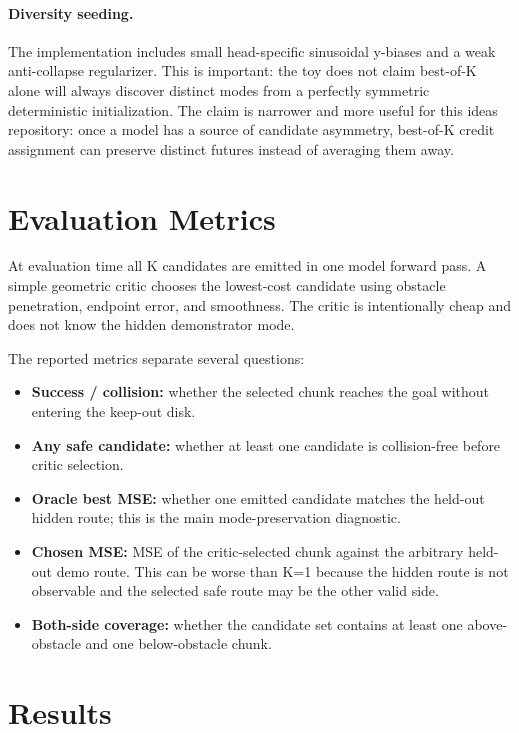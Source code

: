 \documentclass[11pt]{article}
\begin{document}
\paragraph{Diversity seeding.}
The implementation includes small head-specific sinusoidal y-biases and a weak anti-collapse regularizer. This is important: the toy does not claim best-of-K alone will always discover distinct modes from a perfectly symmetric deterministic initialization. The claim is narrower and more useful for this ideas repository: once a model has a source of candidate asymmetry, best-of-K credit assignment can preserve distinct futures instead of averaging them away.

\section{Evaluation Metrics}

At evaluation time all K candidates are emitted in one model forward pass. A simple geometric critic chooses the lowest-cost candidate using obstacle penetration, endpoint error, and smoothness. The critic is intentionally cheap and does not know the hidden demonstrator mode.

The reported metrics separate several questions:
\begin{itemize}[leftmargin=1.5em]
  \item \textbf{Success / collision:} whether the selected chunk reaches the goal without entering the keep-out disk.
  \item \textbf{Any safe candidate:} whether at least one candidate is collision-free before critic selection.
  \item \textbf{Oracle best MSE:} whether one emitted candidate matches the held-out hidden route; this is the main mode-preservation diagnostic.
  \item \textbf{Chosen MSE:} MSE of the critic-selected chunk against the arbitrary held-out demo route. This can be worse than K=1 because the hidden route is not observable and the selected safe route may be the other valid side.
  \item \textbf{Both-side coverage:} whether the candidate set contains at least one above-obstacle and one below-obstacle chunk.
\end{itemize}

\section{Results}
\end{document}
